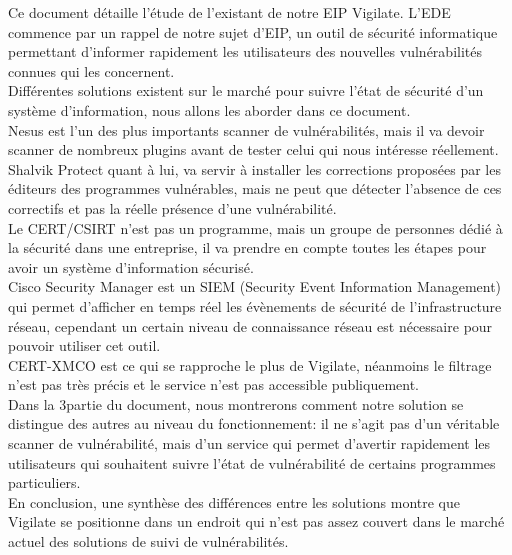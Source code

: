 Ce document détaille l'étude de l'existant de notre EIP Vigilate. L'EDE commence par un rappel de notre sujet d'EIP, un outil de sécurité informatique permettant d'informer rapidement les utilisateurs des nouvelles vulnérabilités connues qui les concernent.\\
Différentes solutions existent sur le marché pour suivre l'état de sécurité d'un système d'information, nous allons les aborder dans ce document.\\
Nesus est l’un des plus importants scanner de vulnérabilités, mais il va devoir scanner de nombreux plugins avant de tester celui qui nous intéresse réellement.\\
Shalvik Protect quant à lui, va servir à installer les corrections proposées par les éditeurs des programmes vulnérables, mais ne peut que détecter l’absence de ces correctifs et pas la réelle présence d’une vulnérabilité.\\
Le CERT/CSIRT n’est pas un programme, mais un groupe de personnes dédié à la sécurité dans une entreprise, il va prendre en compte toutes les étapes pour avoir un système d’information sécurisé.\\
Cisco Security Manager est un SIEM (Security Event Information Management) qui permet d’afficher en temps réel les évènements de sécurité de l'infrastructure réseau, cependant un certain niveau de connaissance réseau est nécessaire pour pouvoir utiliser cet outil.\\
CERT-XMCO est ce qui se rapproche le plus de Vigilate, néanmoins le filtrage n’est pas très précis et le service n’est pas accessible publiquement.\\
Dans la 3\ieme partie du document, nous montrerons comment notre solution se distingue des autres au niveau du fonctionnement: il ne s’agit pas d’un véritable scanner de vulnérabilité, mais d’un service qui permet d’avertir rapidement les utilisateurs qui souhaitent suivre l’état de vulnérabilité de certains programmes particuliers.\\
En conclusion, une synthèse des différences entre les solutions montre que Vigilate se positionne dans un endroit qui n’est pas assez couvert dans le marché actuel des solutions de suivi de vulnérabilités.\\

